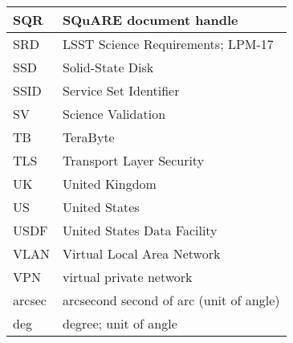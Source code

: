 \begin{longtable}{p{}p{}}
SQR & SQuARE document handle \\\hline
SRD & LSST Science Requirements; LPM-17 \\\hline
SSD & Solid-State Disk \\\hline
SSID & Service Set Identifier \\\hline
SV & Science Validation \\\hline
TB & TeraByte \\\hline
TLS & Transport Layer Security \\\hline
UK & United Kingdom \\\hline
US & United States \\\hline
USDF & United States Data Facility \\\hline
VLAN &  Virtual Local Area Network \\\hline
VPN & virtual private network \\\hline
arcsec & arcsecond second of arc (unit of angle) \\\hline
deg & degree; unit of angle \\\hline
\end{longtable}
